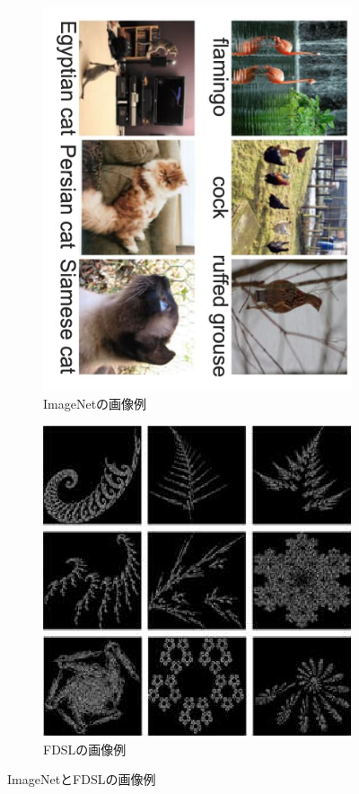 \documentclass[a4paper,11pt,nomag]{jsreport}
\begin{document}
\begin{figure}[tbp]
  \centering
  \begin{subfigure}[b]{0.45\linewidth}
    \centering
    \includegraphics[height=0.9\linewidth, keepaspectratio]{image/imagenet.png}
    \caption{ImageNetの画像例}
    \label{fig:imagenet}
  \end{subfigure}
  \hfill
  \begin{subfigure}[b]{0.45\linewidth}
    \centering
    \includegraphics[height=0.9\linewidth, keepaspectratio]{image/fdsl.png}
    \caption{FDSLの画像例}
    \label{fig:fdsl}
  \end{subfigure}
  \caption{ImageNetとFDSLの画像例}
  \label{fig:transfer_learning}
\end{figure}
\end{document}
